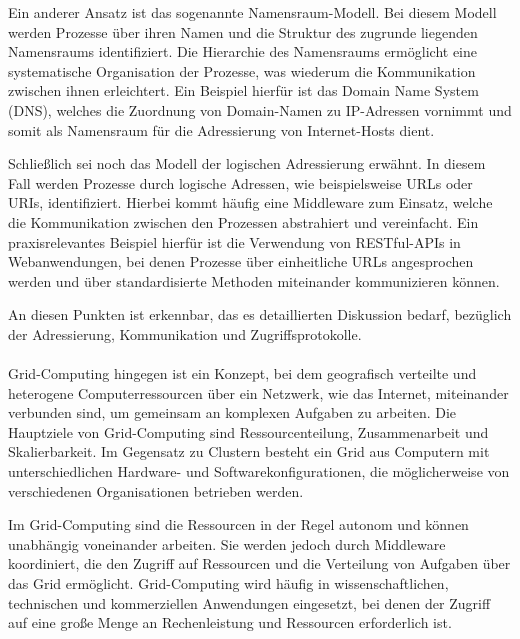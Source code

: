 Ein anderer Ansatz ist das sogenannte Namensraum-Modell. Bei diesem Modell werden Prozesse über ihren Namen und die Struktur des zugrunde liegenden Namensraums identifiziert. Die Hierarchie des Namensraums ermöglicht eine systematische Organisation der Prozesse, was wiederum die Kommunikation zwischen ihnen erleichtert. Ein Beispiel hierfür ist das Domain Name System (DNS), welches die Zuordnung von Domain-Namen zu IP-Adressen vornimmt und somit als Namensraum für die Adressierung von Internet-Hosts dient.

Schließlich sei noch das Modell der logischen Adressierung erwähnt. In diesem Fall werden Prozesse durch logische Adressen, wie beispielsweise URLs oder URIs, identifiziert. Hierbei kommt häufig eine Middleware zum Einsatz, welche die Kommunikation zwischen den Prozessen abstrahiert und vereinfacht. Ein praxisrelevantes Beispiel hierfür ist die Verwendung von RESTful-APIs in Webanwendungen, bei denen Prozesse über einheitliche URLs angesprochen werden und über standardisierte Methoden miteinander kommunizieren können.

An diesen Punkten ist erkennbar, das es detaillierten Diskussion bedarf, bezüglich der Adressierung, Kommunikation und Zugriffsprotokolle.
\\\\
Grid-Computing hingegen ist ein Konzept, bei dem geografisch verteilte und heterogene Computerressourcen über ein Netzwerk, wie das Internet, miteinander verbunden sind, um gemeinsam an komplexen Aufgaben zu arbeiten. Die Hauptziele von Grid-Computing sind Ressourcenteilung, Zusammenarbeit und Skalierbarkeit. Im Gegensatz zu Clustern besteht ein Grid aus Computern mit unterschiedlichen Hardware- und Softwarekonfigurationen, die möglicherweise von verschiedenen Organisationen betrieben werden.

Im Grid-Computing sind die Ressourcen in der Regel autonom und können unabhängig voneinander arbeiten. Sie werden jedoch durch Middleware koordiniert, die den Zugriff auf Ressourcen und die Verteilung von Aufgaben über das Grid ermöglicht. Grid-Computing wird häufig in wissenschaftlichen, technischen und kommerziellen Anwendungen eingesetzt, bei denen der Zugriff auf eine große Menge an Rechenleistung und Ressourcen erforderlich ist.
